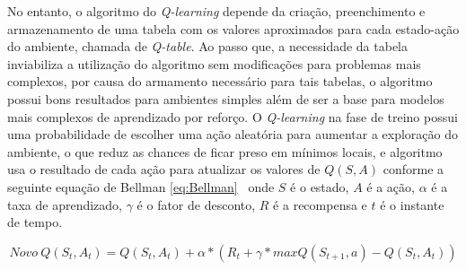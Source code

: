 No entanto, o algoritmo do \textit{Q-learning} depende da criação, preenchimento e armazenamento de uma tabela com os valores aproximados para cada estado-ação do ambiente, chamada de \textit{Q-table}. Ao passo que, a necessidade da tabela inviabiliza a utilização do algoritmo sem modificações para problemas mais complexos, por causa do armamento necessário para tais tabelas, o algoritmo possui bons resultados para ambientes simples além de ser a base para modelos mais complexos de aprendizado por reforço. O \textit{Q-learning} na fase de treino possui uma probabilidade de escolher uma ação aleatória para aumentar a exploração do ambiente, o que reduz as chances de ficar preso em mínimos locais, e algoritmo usa o resultado de cada ação para atualizar os valores de $Q(S, A)$ conforme a seguinte equação de Bellman \ref{eq:Bellman}~\citep{Bellman_1954} onde $S$ é o estado, $A$ é a ação, $\alpha$ é a taxa de aprendizado, $\gamma$ é o fator de desconto, $R$ é a recompensa e $t$ é o instante de tempo.

\begin{equation}
	\label{eq:Bellman}
	Novo \ Q(S_{t}, A_{t}) = Q(S_{t}, A_{t}) + \alpha * (R_{t} + \gamma * maxQ(S_{t+1}, a) - Q(S_{t}, A_{t}))
\end{equation}
